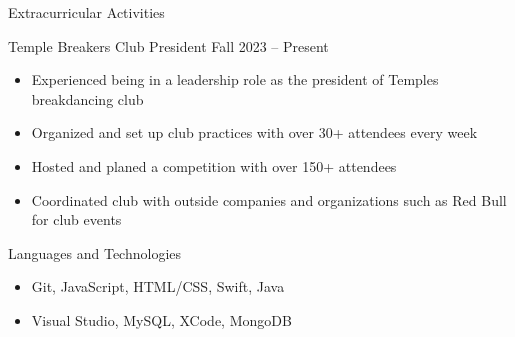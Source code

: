 \documentclass[]{mcdowellcv}
\begin{document}
	

	
	\begin{cvsection}{Extracurricular Activities}
		\begin{cvsubsection}{Temple Breakers Club President}{}{ Fall 2023 -- Present}	
			\begin{itemize}
				\item Experienced being in a leadership role as the president of Temples breakdancing club
				\item Organized and set up club practices with over 30+ attendees every week
				\item Hosted and planed a competition with over 150+ attendees
				\item Coordinated club with outside companies and organizations such as Red Bull for club events
			\end{itemize}
		\end{cvsubsection}
	\end{cvsection}



	
	\begin{cvsection}{Languages and Technologies}
		\begin{cvsubsection}{}{}{}	
			\begin{itemize}
				\item Git, JavaScript, HTML/CSS, Swift, Java
				\item Visual Studio, MySQL, XCode, MongoDB
			\end{itemize}
		\end{cvsubsection}
	\end{cvsection}
	
\end{document}
